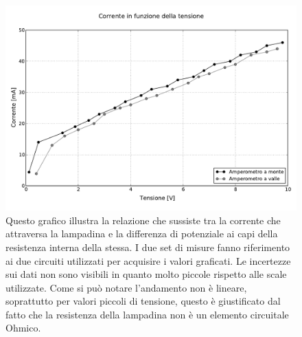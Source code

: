 \begin{figure}
        \centering
        \includegraphics[scale=0.50]{lampadina.pdf}
        \caption{Questo grafico illustra la relazione che sussiste tra la corrente che attraversa la lampadina e la differenza di potenziale ai capi della resistenza interna della stessa. I due set di misure fanno riferimento ai due circuiti utilizzati per acquisire i valori graficati. Le incertezze sui dati non sono visibili in quanto molto piccole rispetto alle scale utilizzate. Come si può notare l'andamento non è lineare, soprattutto per valori piccoli di tensione, questo è giustificato dal fatto che la resistenza della lampadina non è un elemento circuitale Ohmico.}
\end{figure}


